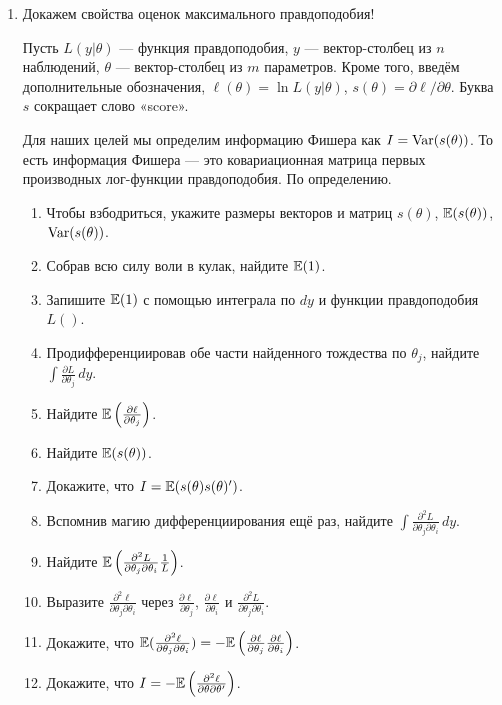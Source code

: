 \documentclass[12pt, a4paper]{article}\usepackage[]{graphicx}\usepackage[]{color}
\begin{document}
\begin{enumerate}

\item Докажем свойства оценок максимального правдоподобия!


Пусть $L(y|\theta)$ — функция правдоподобия, $y$ — вектор-столбец из $n$ наблюдений, $\theta$ — вектор-столбец из $m$ параметров. Кроме того, введём дополнительные обозначения, $\ell(\theta)=\ln L(y|\theta)$, $s(\theta) = \partial \ell/\partial \theta$. Буква $s$ сокращает слово «score».

Для наших целей мы определим информацию Фишера как $I=\operatorname{Var}(s(\theta))$. То есть информация Фишера — это ковариационная матрица первых производных лог-функции правдоподобия. По определению.


\begin{enumerate}
  \item Чтобы взбодриться, укажите размеры векторов и матриц $s(\theta)$, $\mathbb{E}(s(\theta))$, $\operatorname{Var}(s(\theta))$.
  \item Собрав всю силу воли в кулак, найдите $\mathbb{E}(1)$.
  \item Запишите $\mathbb{E}(1)$ с помощью интеграла по $dy$ и функции правдоподобия $L()$.
  \item Продифференциировав обе части найденного тождества по $\theta_j$, найдите $\int \frac{\partial L}{\partial \theta_j} \, dy$.
  \item Найдите $\mathbb{E}\left( \frac{\partial \ell}{\partial \theta_j} \right)$.
  \item Найдите $\mathbb{E}(s(\theta))$.
  \item Докажите, что $I=\mathbb{E}(s(\theta)s(\theta)')$.
  \item Вспомнив магию дифференциирования ещё раз, найдите    $\int \frac{\partial^2 L}{\partial \theta_j\partial \theta_i} \, dy$.
  \item Найдите $\mathbb{E}\left(\frac{\partial^2 L}{\partial \theta_j\partial \theta_i} \frac{1}{L}\right)$.
  \item Выразите $\frac{\partial^2 \ell}{\partial \theta_j\partial \theta_i}$ через $\frac{\partial \ell}{\partial \theta_j}$, $\frac{\partial \ell}{\partial \theta_i}$ и $\frac{\partial^2 L}{\partial \theta_j\partial \theta_i}$.
  \item Докажите, что $\mathbb{E}(\frac{\partial^2 \ell}{\partial \theta_j\partial \theta_i}) = - \mathbb{E}\left(\frac{\partial \ell}{\partial \theta_j} \frac{\partial \ell}{\partial \theta_i}\right)$.
  \item Докажите, что $I=-\mathbb{E}\left(\frac{\partial^2 \ell}{\partial \theta\partial \theta'}\right)$.


\end{enumerate}
\end{enumerate}
\end{document}

